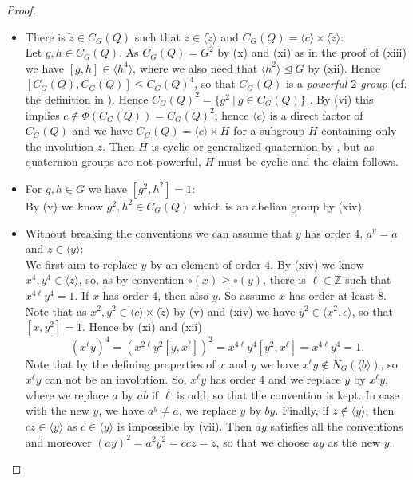 \documentclass[a4paper,10pt]{amsart}
\theoremstyle{definition}
\theoremstyle{remark}
\begin{document}
\begin{proof}
\begin{itemize}
\item[(xiv)] There is $\tilde{z} \in C_G(Q)$ such that $z \in \langle \tilde{z} \rangle$ and $C_G(Q) = \langle c \rangle \times \langle \tilde{z} \rangle$:\\
Let $g,h\in C_G(Q)$. As $C_G(Q) = G^2$ by (x) and (xi) as in the proof of (xiii) we have $[g,h] \in \langle h^4 \rangle$, where we also need that $\langle h^2 \rangle \unlhd G$ by (xii). Hence $[C_G(Q), C_G(Q)] \leq C_G(Q)^4$, so that $C_G(Q)$ is a \emph{powerful $2$-group} (cf. the definition in \cite[I, Definition 2.1]{DdSMS}). Hence $C_G(Q)^2 = \{g^2 \ | \ g \in C_G(Q) \}$ \cite[I, Proposition 2.6]{DdSMS}. By (vi) this implies $c \notin \Phi(C_G(Q)) = C_G(Q)^2$, hence $\langle c \rangle$ is a direct factor of $C_G(Q)$ and we have $C_G(Q) = \langle c \rangle \times H$ for a subgroup $H$ containing only the involution $z$. Then $H$ is cyclic or generalized quaternion by , but as quaternion groups are not powerful, $H$ must be cyclic and the claim follows.

\item[(xv)] For $g,h \in G$ we have $[g^2, h^2] = 1$:\\
By (v) we know $g^2, h^2 \in C_G(Q)$ which is an abelian group by (xiv).

\item[(xvi)] Without breaking the conventions we can assume that $y$ has order $4$, $a^y = a$ and $z \in \langle y \rangle$:\\
We first aim to replace $y$ by an element of order $4$. By (xiv) we know $x^4, y^4 \in \langle \tilde{z} \rangle$, so, as by convention $\circ(x) \geq \circ(y)$, there is $\ell \in \mathbb{Z}$ such that $x^{4\ell}y^4 = 1$. If $x$ has order $4$, then also $y$. So assume $x$ has order at least $8$. Note that as $x^2, y^2 \in \langle c \rangle \times \langle \tilde{z} \rangle$ by (v) and (xiv) we have $y^2 \in \langle x^2, c \rangle$, so that $[x,y^2] = 1$. Hence by (xi) and (xii)
\[(x^\ell y)^4 = (x^{2\ell}y^2[y,x^\ell])^2 = x^{4 \ell}y^4[y^2,x^\ell] = x^{4\ell}y^4 = 1. \]
Note that by the defining properties of $x$ and $y$ we have $x^\ell y \notin N_G(\langle b \rangle)$, so $x^\ell y$ can not be an involution.
So, $x^\ell y$ has order $4$ and we replace $y$ by $x^\ell y$, where we replace $a$ by $ab$ if $\ell$ is odd, so that the convention is kept. In case with the new $y$, we have $a^y \neq a$, we replace $y$ by $by$. Finally, if $z \notin \langle y \rangle$, then $cz \in \langle y \rangle$ as $c \in \langle y \rangle$ is impossible by (vii). Then $ay$ satisfies all the conventions and moreover $(ay)^2 = a^2y^2 = ccz = z$, so that we choose $ay$ as the new $y$.


\end{itemize}
\end{proof}
\end{document}

